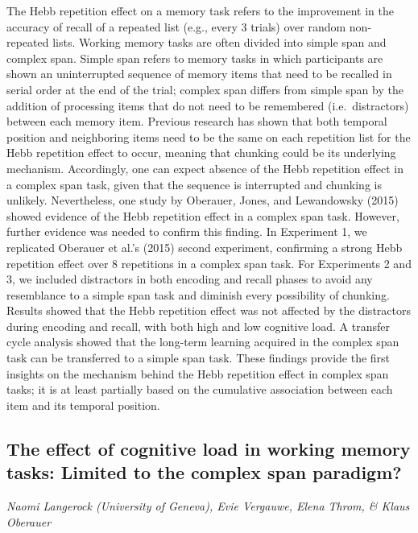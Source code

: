 \documentclass[
  12pt,
]{book}
\begin{document}
The Hebb repetition effect on a memory task refers to the improvement in the accuracy of recall of a repeated list (e.g., every 3 trials) over random non-repeated lists. Working memory tasks are often divided into simple span and complex span. Simple span refers to memory tasks in which participants are shown an uninterrupted sequence of memory items that need to be recalled in serial order at the end of the trial; complex span differs from simple span by the addition of processing items that do not need to be remembered (i.e.~distractors) between each memory item. Previous research has shown that both temporal position and neighboring items need to be the same on each repetition list for the Hebb repetition effect to occur, meaning that chunking could be its underlying mechanism. Accordingly, one can expect absence of the Hebb repetition effect in a complex span task, given that the sequence is interrupted and chunking is unlikely. Nevertheless, one study by Oberauer, Jones, and Lewandowsky (2015) showed evidence of the Hebb repetition effect in a complex span task. However, further evidence was needed to confirm this finding.
In Experiment 1, we replicated Oberauer et al.'s (2015) second experiment, confirming a strong Hebb repetition effect over 8 repetitions in a complex span task. For Experiments 2 and 3, we included distractors in both encoding and recall phases to avoid any resemblance to a simple span task and diminish every possibility of chunking. Results showed that the Hebb repetition effect was not affected by the distractors during encoding and recall, with both high and low cognitive load. A transfer cycle analysis showed that the long-term learning acquired in the complex span task can be transferred to a simple span task. These findings provide the first insights on the mechanism behind the Hebb repetition effect in complex span tasks; it is at least partially based on the cumulative association between each item and its temporal position.

\hypertarget{the-effect-of-cognitive-load-in-working-memory-tasks-limited-to-the-complex-span-paradigm}{%
\subsection{The effect of cognitive load in working memory tasks: Limited to the complex span paradigm?}\label{the-effect-of-cognitive-load-in-working-memory-tasks-limited-to-the-complex-span-paradigm}}

\emph{Naomi Langerock (University of Geneva), Evie Vergauwe, Elena Throm, \& Klaus Oberauer}
\end{document}
